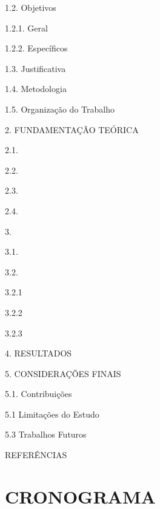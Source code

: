 \documentclass[
    12pt,				       %
    openright,			       %
    oneside,			       %
    a4paper,			       %
    chapter=TITLE,             %
    sumario=tradicional,       %
    english,			        %
    brazil, 				    %
 ]{abntex2}
\begin{document}
\hspace{2em} 1.2. Objetivos

\hspace{4em} 1.2.1. Geral

\hspace{4em} 1.2.2. Específicos

\hspace{2em} 1.3. Justificativa

\hspace{2em} 1.4. Metodologia

\hspace{2em} 1.5. Organização do Trabalho

\hspace{0em} 2. FUNDAMENTAÇÃO TEÓRICA

\hspace{2em} 2.1. 

\hspace{2em} 2.2. 

\hspace{2em} 2.3. 

\hspace{2em} 2.4. 

\hspace{0em} 3. 

\hspace{2em} 3.1. 

\hspace{2em} 3.2. 

\hspace{4em} 3.2.1 

\hspace{4em} 3.2.2 

\hspace{4em} 3.2.3 

\hspace{0em} 4. RESULTADOS

\hspace{0em} 5. CONSIDERAÇÕES FINAIS

\hspace{2em} 5.1. Contribuições

\hspace{2em} 5.1 Limitações do Estudo

\hspace{2em} 5.3 Trabalhos Futuros

\hspace{0em} REFERÊNCIAS


\chapter{CRONOGRAMA}\label{sec:cronograma}
\end{document}
